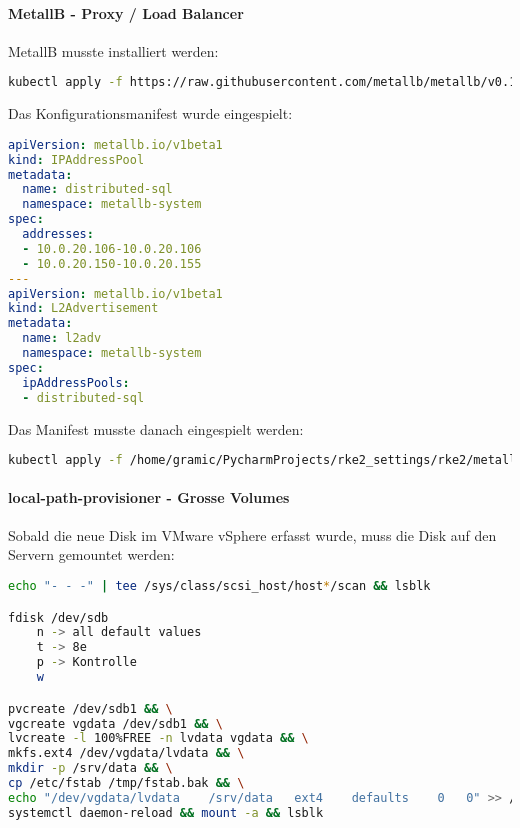 \paragraph{MetallB - Proxy / Load Balancer}
MetallB musste installiert werden:
\lstset{style=gra_codestyle}
\begin{lstlisting}[language=bash, caption=MetallB installieren,captionpos=b,label={lst:metallb-install},breaklines=true]
kubectl apply -f https://raw.githubusercontent.com/metallb/metallb/v0.14.4/config/manifests/metallb-native.yaml
\end{lstlisting}

Das Konfigurationsmanifest wurde eingespielt:
\lstset{style=gra_codestyle}
\begin{lstlisting}[language=yaml, caption=MetallB konfigurieren,captionpos=b,label={lst:metallb-config},breaklines=true]
apiVersion: metallb.io/v1beta1
kind: IPAddressPool
metadata:
  name: distributed-sql
  namespace: metallb-system
spec:
  addresses:
  - 10.0.20.106-10.0.20.106
  - 10.0.20.150-10.0.20.155
---
apiVersion: metallb.io/v1beta1
kind: L2Advertisement
metadata:
  name: l2adv
  namespace: metallb-system
spec:
  ipAddressPools:
  - distributed-sql
\end{lstlisting}

Das Manifest musste danach eingespielt werden:
\lstset{style=gra_codestyle}
\begin{lstlisting}[language=bash, caption=MetallB Konfiguration einspielen,captionpos=b,label={lst:metallb-apply},breaklines=true]
kubectl apply -f /home/gramic/PycharmProjects/rke2_settings/rke2/metallb-values.yaml
\end{lstlisting}

\paragraph{local-path-provisioner - Grosse Volumes}
Sobald die neue Disk im \Gls{VMware vSphere} erfasst wurde, muss die Disk auf den Servern gemountet werden:
\lstset{style=gra_codestyle}
\begin{lstlisting}[language=bash, caption=rke2 - 250GiB Disk mount,captionpos=b,label={lst:rke2_250gib_disk_moint},breaklines=true]
echo "- - -" | tee /sys/class/scsi_host/host*/scan && lsblk

fdisk /dev/sdb
	n -> all default values
	t -> 8e
	p -> Kontrolle
	w

pvcreate /dev/sdb1 && \
vgcreate vgdata /dev/sdb1 && \
lvcreate -l 100%FREE -n lvdata vgdata && \
mkfs.ext4 /dev/vgdata/lvdata && \
mkdir -p /srv/data && \
cp /etc/fstab /tmp/fstab.bak && \
echo "/dev/vgdata/lvdata	/srv/data	ext4	defaults	0	0" >> /etc/fstab && \
systemctl daemon-reload && mount -a && lsblk
\end{lstlisting}

